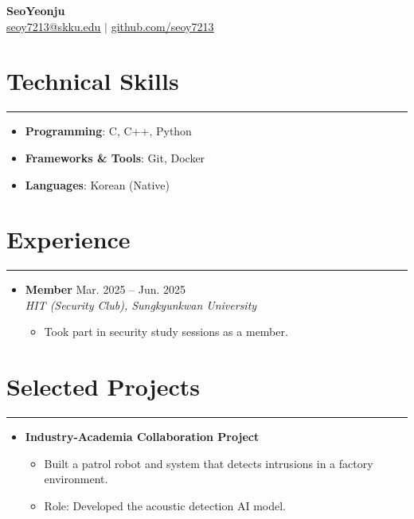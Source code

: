 \documentclass[letterpaper, 10pt]{article}
\begin{document}
\begin{center}
\textbf{\LARGE SeoYeonju} \\ \vspace{2pt}
\href{mailto:seoy7213@skku.edu}{\underline{seoy7213@skku.edu}} $|$
\href{https://github.com/seoy7213}{\underline{github.com/seoy7213}}
\end{center}
\section*{Technical Skills}
\hrule
\vspace{4pt}
\begin{itemize}
\item[] \textbf{Programming}: C, C++, Python
\item[] \textbf{Frameworks \& Tools}: Git, Docker
\item[] \textbf{Languages}: Korean (Native)
\end{itemize}
\section*{Experience}
\hrule
\vspace{4pt}
\begin{itemize}
\item[]
\textbf{Member} \hfill Mar. 2025 -- Jun. 2025 \\
\textit{HIT (Security Club), Sungkyunkwan University} 
\begin{itemize}
\item Took part in security study sessions as a member.
\end{itemize}
\end{itemize}
\section*{Selected Projects}
\hrule
\vspace{4pt}
\begin{itemize}
\item[]
\textbf{Industry-Academia Collaboration Project} \\
\begin{itemize}
\item Built a patrol robot and system that detects intrusions in a factory environment.
\item Role: Developed the acoustic detection AI model.
\end{itemize}
\end{itemize}
\end{document}
